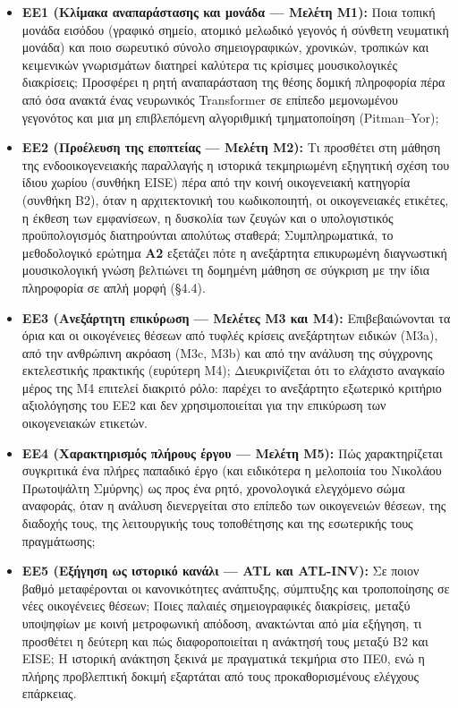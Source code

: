 \documentclass[11pt,a4paper]{article}
\begin{document}
\begin{itemize}
\item
  \textbf{ΕΕ1 (Κλίμακα αναπαράστασης και μονάδα --- Μελέτη Μ1):} Ποια τοπική μονάδα εισόδου (γραφικό σημείο, ατομικό μελωδικό γεγονός ή σύνθετη νευματική μονάδα) και ποιο σωρευτικό σύνολο σημειογραφικών, χρονικών, τροπικών και κειμενικών γνωρισμάτων διατηρεί καλύτερα τις κρίσιμες μουσικολογικές διακρίσεις; Προσφέρει η ρητή αναπαράσταση της θέσης δομική πληροφορία πέρα από όσα ανακτά ένας νευρωνικός Transformer σε επίπεδο μεμονωμένου γεγονότος και μια μη επιβλεπόμενη αλγοριθμική τμηματοποίηση (Pitman--Yor);
\item
  \textbf{ΕΕ2 (Προέλευση της εποπτείας --- Μελέτη Μ2):} Τι προσθέτει στη μάθηση της ενδοοικογενειακής παραλλαγής η ιστορικά τεκμηριωμένη εξηγητική σχέση του ίδιου χωρίου (συνθήκη EISE) πέρα από την κοινή οικογενειακή κατηγορία (συνθήκη B2), όταν η αρχιτεκτονική του κωδικοποιητή, οι οικογενειακές ετικέτες, η έκθεση των εμφανίσεων, η δυσκολία των ζευγών και ο υπολογιστικός προϋπολογισμός διατηρούνται απολύτως σταθερά; Συμπληρωματικά, το μεθοδολογικό ερώτημα \textbf{Α2} εξετάζει πότε η ανεξάρτητα επικυρωμένη διαγνωστική μουσικολογική γνώση βελτιώνει τη δομημένη μάθηση σε σύγκριση με την ίδια πληροφορία σε απλή μορφή (§4.4).
\item
  \textbf{ΕΕ3 (Ανεξάρτητη επικύρωση --- Μελέτες Μ3 και Μ4):} Επιβεβαιώνονται τα όρια και οι οικογένειες θέσεων από τυφλές κρίσεις ανεξάρτητων ειδικών (Μ3a), από την ανθρώπινη ακρόαση (Μ3c, Μ3b) και από την ανάλυση της σύγχρονης εκτελεστικής πρακτικής (ευρύτερη Μ4); Διευκρινίζεται ότι το ελάχιστο αναγκαίο μέρος της Μ4 επιτελεί διακριτό ρόλο: παρέχει το ανεξάρτητο εξωτερικό κριτήριο αξιολόγησης του ΕΕ2 και δεν χρησιμοποιείται για την επικύρωση των οικογενειακών ετικετών.
\item
  \textbf{ΕΕ4 (Χαρακτηρισμός πλήρους έργου --- Μελέτη Μ5):} Πώς χαρακτηρίζεται συγκριτικά ένα πλήρες παπαδικό έργο (και ειδικότερα η μελοποιία του Νικολάου Πρωτοψάλτη Σμύρνης) ως προς ένα ρητό, χρονολογικά ελεγχόμενο σώμα αναφοράς, όταν η ανάλυση διενεργείται στο επίπεδο των οικογενειών θέσεων, της διαδοχής τους, της λειτουργικής τους τοποθέτησης και της εσωτερικής τους πραγμάτωσης;
\item
  \textbf{ΕΕ5 (Εξήγηση ως ιστορικό κανάλι --- ATL και ATL-INV):} Σε ποιον βαθμό μεταφέρονται οι κανονικότητες ανάπτυξης, σύμπτυξης και τροποποίησης σε νέες οικογένειες θέσεων; Ποιες παλαιές σημειογραφικές διακρίσεις, μεταξύ υποψηφίων με κοινή μετροφωνική απόδοση, ανακτώνται από μία εξήγηση, τι προσθέτει η δεύτερη και πώς διαφοροποιείται η ανάκτησή τους μεταξύ B2 και EISE; Η ιστορική ανάκτηση ξεκινά με πραγματικά τεκμήρια στο ΠΕ0, ενώ η πλήρης προβλεπτική δοκιμή εξαρτάται από τους προκαθορισμένους ελέγχους επάρκειας.

\end{itemize}
\end{document}
